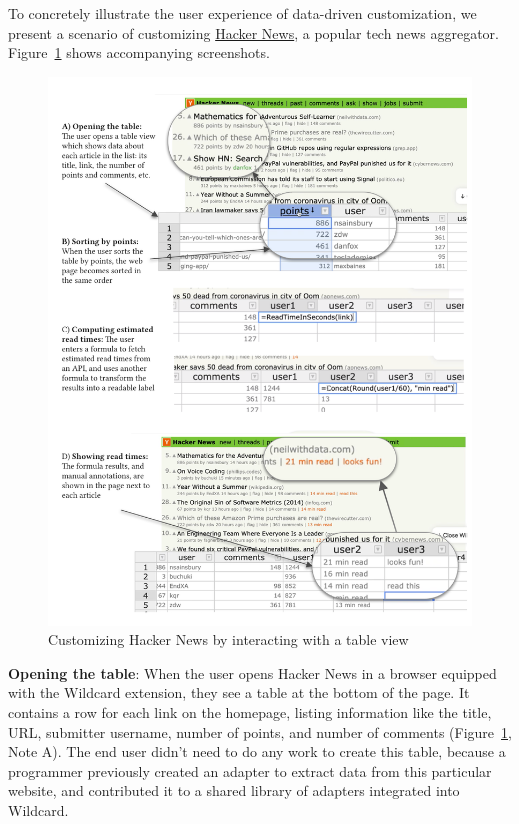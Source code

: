 \documentclass[sigplan,screen,10pt,anonymous,review]{acmart}
\begin{document}
To concretely illustrate the user experience of data-driven
customization, we present a scenario of customizing
\href{https://news.ycombinator.com/}{Hacker News}, a popular tech news
aggregator. Figure~\ref{fig:hacker-news} shows accompanying screenshots.

\begin{figure}
\hypertarget{fig:hacker-news}{%
\centering
\includegraphics[width=\textwidth]{media/hacker-news.png}
\caption{Customizing Hacker News by interacting with a table view}\label{fig:hacker-news}
}
\end{figure}

\textbf{Opening the table}: When the user opens Hacker News in a browser
equipped with the Wildcard extension, they see a table at the bottom of
the page. It contains a row for each link on the homepage, listing
information like the title, URL, submitter username, number of points,
and number of comments (Figure~\ref{fig:hacker-news}, Note A). The end
user didn't need to do any work to create this table, because a
programmer previously created an adapter to extract data from this
particular website, and contributed it to a shared library of adapters
integrated into Wildcard.
\end{document}
